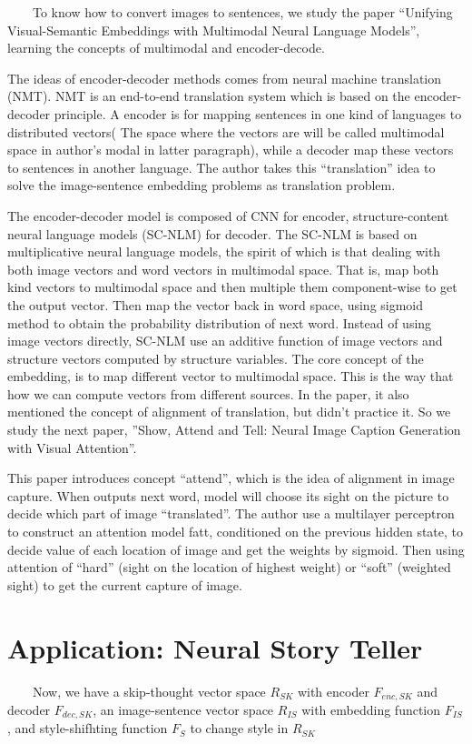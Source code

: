 \documentclass{article}
\begin{document}
    ~~~~To know how to convert images to sentences, we study the paper “Unifying Visual-Semantic Embeddings with Multimodal Neural Language Models”, learning the concepts of multimodal and encoder-decode.

	The ideas of encoder-decoder methods comes from neural machine translation (NMT). NMT is an end-to-end translation system which is based on the encoder-decoder principle. A encoder is for mapping sentences in one kind of languages to distributed vectors( The space where the vectors are will be called multimodal space in author’s modal in latter paragraph), while a decoder map these vectors to sentences in another language. The author takes this “translation” idea to solve the image-sentence embedding problems as translation problem.
	
	The encoder-decoder model is composed of CNN for encoder, structure-content neural language models (SC-NLM) for decoder. The SC-NLM is based on multiplicative neural language models, the spirit of which is that dealing with both image vectors and word vectors in multimodal space. That is, map both kind vectors to multimodal space and then multiple them component-wise to get the output vector. Then map the vector back in word space, using sigmoid method to obtain the probability distribution of next word. Instead of using image vectors directly, SC-NLM use an additive function of image vectors and structure vectors computed by structure variables.
	The core concept of the embedding, is to map different vector to multimodal space. This is the way that how we can compute vectors from different sources. In the paper, it also mentioned the concept of alignment of translation, but didn’t practice it. So we study the next paper, ”Show, Attend and Tell: Neural Image Caption Generation with Visual Attention”.
	
	This paper introduces concept “attend”, which is the idea of alignment in image capture. When outputs next word, model will choose its sight on the picture to decide which part of image “translated”. The author use a multilayer perceptron to construct an attention model fatt, conditioned on the previous hidden state, to decide value of each location of image and get the weights by sigmoid. Then using attention of “hard” (sight on the location of highest weight) or “soft” (weighted sight) to get the current capture of image.
 	
\section{Application: Neural Story Teller}
			\par ~~~~Now, we have a skip-thought vector space $R_{SK}$ with encoder $F_{enc,SK}$ and decoder $F_{dec,SK}$, an image-sentence vector space $R_{IS}$ with embedding function $F_{IS}$, and style-shifhting function $F_S$ to change style in $R_{SK}$
\end{document}
